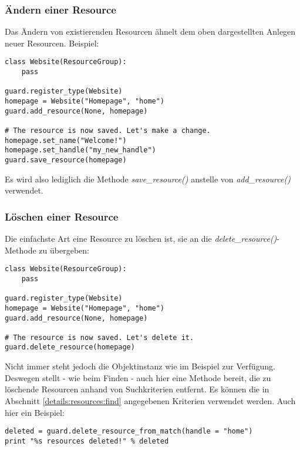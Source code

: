 \subsubsection{\label{details:resources:modify}Ändern einer Resource}

Das Ändern von existierenden Resourcen ähnelt dem oben dargestellten 
Anlegen neuer Resourcen. Beispiel:

\begin{lstlisting}
class Website(ResourceGroup):
    pass

guard.register_type(Website)
homepage = Website("Homepage", "home")
guard.add_resource(None, homepage)

# The resource is now saved. Let's make a change.
homepage.set_name("Welcome!")
homepage.set_handle("my_new_handle")
guard.save_resource(homepage)
\end{lstlisting}

Es wird also lediglich die Methode {\it save\_resource()} anstelle von
{\it add\_resource()} verwendet.


\subsubsection{\label{details:resources:delete}Löschen einer Resource}

Die einfachste Art eine Resource zu löschen ist, sie an die 
{\it delete\_resource()}-Methode zu übergeben:

\begin{lstlisting}
class Website(ResourceGroup):
    pass

guard.register_type(Website)
homepage = Website("Homepage", "home")
guard.add_resource(None, homepage)

# The resource is now saved. Let's delete it.
guard.delete_resource(homepage)
\end{lstlisting}

Nicht immer steht jedoch die Objektinstanz wie im Beispiel zur Verfügung.
Deswegen stellt \product - wie beim Finden - auch hier eine Methode bereit, 
die zu löschende Resourcen anhand von Suchkriterien entfernt. Es 
können die in Abschnitt \ref{details:resources:find} angegebenen Kriterien 
verwendet werden. Auch hier ein Beispiel:

\begin{lstlisting}
deleted = guard.delete_resource_from_match(handle = "home")
print "%s resources deleted!" % deleted
\end{lstlisting}


